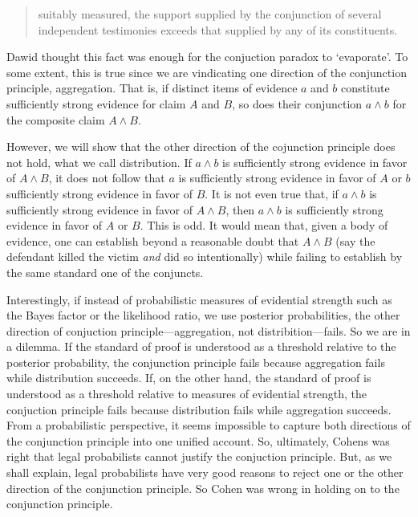 \documentclass[10pt,dvipsnames,enabledeprecatedfontcommands]{scrartcl}
\begin{document}
\begin{quote} suitably measured, the support  supplied by the conjunction of several independent testimonies exceeds that supplied by any of its constituents.
 \end{quote}

\noindent Dawid thought this fact was enough for the conjuction paradox
to `evaporate'. To some extent, this is true since we are vindicating
one direction of the conjunction principle, aggregation. That is, if
distinct items of evidence \(a\) and \(b\) constitute sufficiently
strong evidence for claim \(A\) and \(B\), so does their conjunction
\(a\wedge b\) for the composite claim \(A\wedge B\).

However, we will show that the other direction of the cojunction
principle does not hold, what we call distribution. If \(a \wedge b\) is
sufficiently strong evidence in favor of \(A \wedge B\), it does not
follow that \(a\) is sufficiently strong evidence in favor of \(A\) or
\(b\) sufficiently strong evidence in favor of \(B\). It is not even
true that, if \(a \wedge b\) is sufficiently strong evidence in favor of
\(A \wedge B\), then \(a\wedge b\) is sufficiently strong evidence in
favor of \(A\) or \(B\). This is odd. It would mean that, given a body
of evidence, one can establish beyond a reasonable doubt that
\(A \wedge B\) (say the defendant killed the victim \textit{and} did so
intentionally) while failing to establish by the same standard one of
the conjuncts.

Interestingly, if instead of probabilistic measures of evidential
strength such as the Bayes factor or the likelihood ratio, we use
posterior probabilities, the other direction of conjuction
principle---aggregation, not distribition---fails. So we are in a
dilemma. If the standard of proof is understood as a threshold relative
to the posterior probability, the conjunction principle fails because
aggregation fails while distribution succeeds. If, on the other hand,
the standard of proof is understood as a threshold relative to measures
of evidential strength, the conjuction principle fails because
distribution fails while aggregation succeeds. From a probabilistic
perspective, it seems impossible to capture both directions of the
conjunction principle into one unified account. So, ultimately, Cohens
was right that legal probabilists cannot justify the conjuction
principle. But, as we shall explain, legal probabilists have very good
reasons to reject one or the other direction of the conjunction
principle. So Cohen was wrong in holding on to the conjunction
principle.
\end{document}
